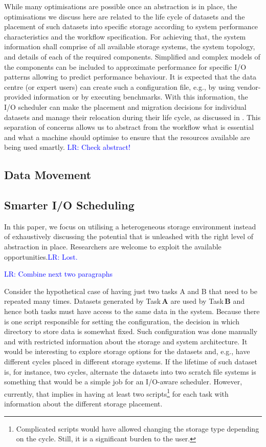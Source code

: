 \documentclass{superfri}
\newcommand{\lr}[1]{\textcolor{blue}{LR: #1}}
\begin{document}
While many optimisations are possible once an abstraction is in place, the optimisations we discuss here are related to the life cycle of datasets and the placement of such datasets into specific storage according to system performance characteristics and the workflow specification.
For achieving that, the system information shall comprise of all available storage systems, the system topology, and details of each of the required components.
Simplified and complex models of the components can be included to approximate performance for specific I/O patterns allowing to predict performance behaviour.
It is expected that the data centre (or expert users) can create such a configuration file, e.g., by using vendor-provided information or by executing benchmarks.
With this information, the I/O scheduler can make the placement and migration decisions for individual datasets and manage their relocation during their life cycle, as discussed in .
This separation of concerns allows us to abstract from the workflow what is essential and what a machine should optimise to ensure that the resources available are being used smartly. \lr{Check abstract!}

\subsection{Data Movement}

\subsection{Smarter I/O Scheduling}

In this paper, we focus on utilising a heterogeneous storage environment instead of exhaustively discussing the potential that is unleashed with the right level of abstraction in place. Researchers are welcome to exploit the available opportunities.\lr{Lost.}

\lr{Combine next two paragraphs}

Consider the hypothetical case of having just two tasks A and B that need to be repeated many times.
Datasets generated by Task\,\textbf{A} are used by Task\,\textbf{B} and hence both tasks must have access to the same data in the system.
Because there is one script responsible for setting the configuration, the decision in which directory to store data is somewhat fixed.
Such configuration was done manually and with restricted information about the storage and system architecture.
It would be interesting to explore storage options for the datasets and, e.g., have different cycles placed in different storage systems.
If the lifetime of such dataset is, for instance, two cycles, alternate the datasets into two scratch file systems is something that would be a simple job for an I/O-aware scheduler.
However, currently, that implies in having at least two scripts\footnote{Complicated scripts would have allowed changing the storage type depending on the cycle. Still, it is a significant burden to the user.} for each task with information about the different storage placement.
\end{document}
